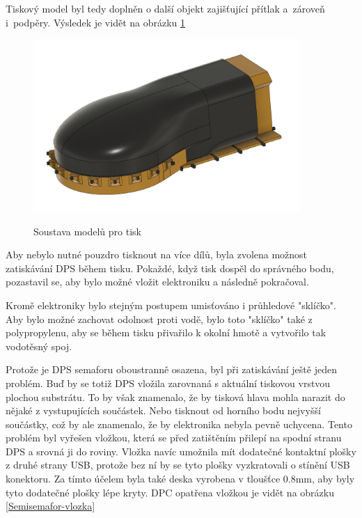 Tiskový model byl tedy doplněn o další objekt zajišťující přítlak a~zároveň i~podpěry.
Výsledek je vidět na obrázku \ref{Semisemafor-box-pritlak}

\begin{figure}[!h]
  \centering
  \includegraphics[width=0.9\textwidth]{text/PraktickaCast/img/Semisemafor-BOX-pritlak.png}
  \label{Semisemafor-box-pritlak}
  \caption{Soustava modelů pro tisk}
\end{figure}

Aby nebylo nutné pouzdro tisknout na více dílů, byla zvolena možnost zatiskávání DPS během tisku.
Pokaždé, když tisk dospěl do správného bodu, pozastavil se, aby bylo možné vložit elektroniku a následně pokračoval.

Kromě elektroniky bylo stejným postupem umisťováno i průhledové "sklíčko".
Aby bylo možné zachovat odolnost proti vodě, bylo toto "sklíčko" také z polypropylenu, aby se během tisku přivařilo k okolní hmotě a vytvořilo tak vodotěsný spoj.

Protože je DPS semaforu oboustranně osazena, byl při zatiskávání ještě jeden problém.
Buď by se totiž DPS vložila zarovnaná s aktuální tiskovou vrstvou plochou substrátu.
To by však znamenalo, že by tisková hlava mohla narazit do nějaké z vystupujících součástek.
Nebo tisknout od horního bodu nejvyšší součástky, což by ale znamenalo, že by elektronika nebyla pevně uchycena.
Tento problém byl vyřešen vložkou, která se před zatištěním přilepí na spodní stranu DPS a srovná ji do roviny.
Vložka navíc umožnila mít dodatečné kontaktní plošky z druhé strany USB, protože bez ní by se tyto plošky vyzkratovali o stínění USB konektoru.
Za tímto účelem byla také deska vyrobena v tloušťce 0.8mm, aby byly tyto dodatečné plošky lépe kryty. 
DPC opatřena vložkou je vidět na obrázku \ref{Semisemafor-vlozka}

